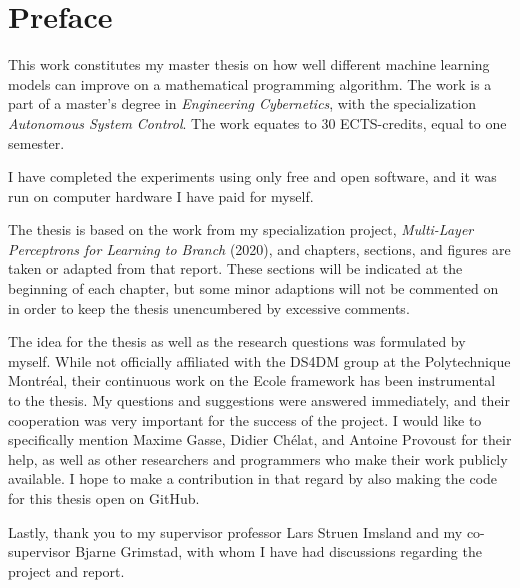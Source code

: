 \chapter*{Preface}
%
This work constitutes my master thesis on how well different machine learning models can improve on a mathematical programming algorithm. The work is a part of a master's degree in \textit{Engineering Cybernetics}, with the specialization\textit{ Autonomous System Control}.
The work equates to 30 ECTS-credits, equal to one semester. 

I have completed the experiments using only free and open software, and it was run on computer hardware I have paid for myself.  

The thesis is based on the work from my specialization project, \textit{Multi-Layer Perceptrons for Learning to Branch
} (2020), and chapters, sections, and figures are taken or adapted from that report. These sections will be indicated at the beginning of each chapter, but some minor adaptions will not be commented on in order to keep the thesis unencumbered by excessive comments.

The idea for the thesis as well as the research questions was formulated by myself.
While not officially affiliated with the \gls{DS4DM} group at the Polytechnique Montr\'{e}al, their continuous work on the \gls{Ecole} framework has been instrumental to the thesis. My questions and suggestions were answered immediately, and their cooperation was very important for the success of the project. I would like to specifically mention Maxime Gasse, Didier Ch\'{e}lat, and Antoine Provoust for their help, as well as other researchers and programmers who make their work publicly available. I hope to make a contribution in that regard by also making the code for this thesis open on GitHub.

Lastly, thank you to my supervisor professor Lars Struen Imsland and my co-supervisor Bjarne Grimstad, with whom I have had discussions regarding the project and report. 


%
\clearpage
